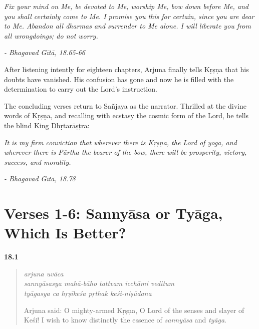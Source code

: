 \begin{customquote}\fontsize{10}{11}\selectfont
\textit{Fix your mind on Me, be devoted to Me, worship Me, bow down before Me, and you shall certainly come to Me. I promise you this for certain, since you are dear to Me. Abandon all \textit{dharmas} and surrender to Me alone. I will liberate you from all wrongdoings; do not worry.}

\textit{- Bhagavad Gītā, 18.65-66}
\end{customquote}

After listening intently for eighteen chapters, Arjuna finally tells Kṛṣṇa that his doubts have vanished. His confusion has gone and now he is filled with the determination to carry out the Lord’s instruction.

The concluding verses return to Sañjaya as the narrator. Thrilled at the divine words of Kṛṣṇa, and recalling with ecstasy the cosmic form of the Lord, he tells the blind King Dhṛtarāṣṭra:

\begin{customquote}\fontsize{10}{11}\selectfont
\textit{It is my firm conviction that wherever there is Kṛṣṇa, the Lord of \textit{yoga}, and wherever there is Pārtha the bearer of the bow, there will be prosperity, victory, success, and morality.}

\textit{- Bhagavad Gītā, 18.78}
\end{customquote}



\section{Verses 1-6: Sannyāsa or Tyāga, Which Is Better?}\label{sec-verses-1-6-sannyasa-or-tyaga-which-is-better}


\par\noindent\textbf{18.1}\par
\begin{verse}
\textit{arjuna uvāca} \\
\textit{sannyāsasya mahā-bāho tattvam icchāmi veditum} \\
\textit{tyāgasya ca hṛṣīkeśa pṛthak keśi-niṣūdana}

\noindent Arjuna said: O mighty-armed Kṛṣṇa, O Lord of the senses and slayer of Keśi! I wish to know distinctly the essence of \textit{sannyāsa} and \textit{tyāga}.
\end{verse}
\par



